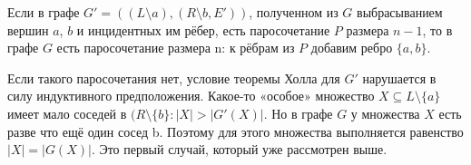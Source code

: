 Если в графе $G' = ((L \setminus {a}), (R \setminus {b}, E'))$, полученном из $G$ выбрасыванием вершин $a$, $b$ и инцидентных им рёбер, есть паросочетание $P$ размера $n - 1$, то в графе $G$ есть паросочетание размера n: к рёбрам из $P$ добавим ребро $\{a, b\}$.

Если такого паросочетания нет, условие теоремы Холла для $G'$ нарушается в силу индуктивного предположения. Какое-то «особое» множество $X \subseteq L \setminus \{a\}$ имеет мало соседей в $(R \setminus \{b\}: |X| > |G'(X)|$. Но в графе $G$ у множества $X$ есть разве что ещё один сосед b. Поэтому для этого множества выполняется равенство $|X| = |G(X)|$. Это первый случай, который уже рассмотрен выше.